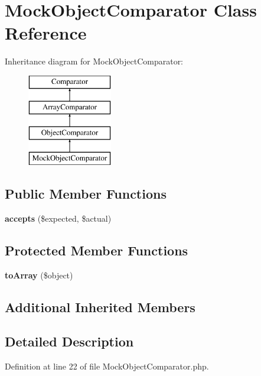 \section{Mock\+Object\+Comparator Class Reference}
\label{class_sebastian_bergmann_1_1_comparator_1_1_mock_object_comparator}
Inheritance diagram for Mock\+Object\+Comparator\+:\begin{figure}[H]
\begin{center}
\leavevmode
\includegraphics[height=4.000000cm]{class_sebastian_bergmann_1_1_comparator_1_1_mock_object_comparator}
\end{center}
\end{figure}
\subsection*{Public Member Functions}
\begin{DoxyCompactItemize}
\item 
{\bf accepts} (\$expected, \$actual)
\end{DoxyCompactItemize}
\subsection*{Protected Member Functions}
\begin{DoxyCompactItemize}
\item 
{\bf to\+Array} (\$object)
\end{DoxyCompactItemize}
\subsection*{Additional Inherited Members}


\subsection{Detailed Description}


Definition at line 22 of file Mock\+Object\+Comparator.\+php.



